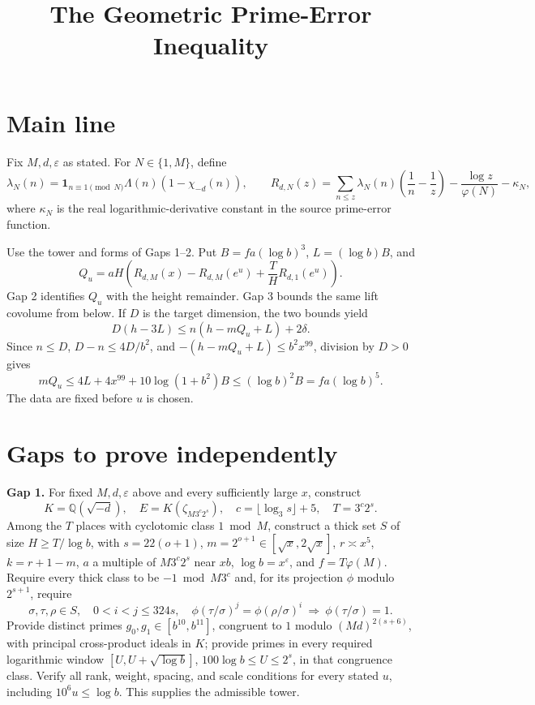 \documentclass[11pt]{article}
\begin{document}
\title{The Geometric Prime-Error Inequality}
\author{}
\date{}
\maketitle

\section*{Main line}
Fix \(M,d,\varepsilon\) as stated. For \(N\in\{1,M\}\), define
\[
\lambda_N(n)=\mathbf1_{n\equiv1\pmod N}\Lambda(n)(1-\chi_{-d}(n)),\qquad
R_{d,N}(z)=\sum_{n\le z}\lambda_N(n)\left(\frac1n-\frac1z\right)
-\frac{\log z}{\varphi(N)}-\kappa_N,
\]
where \(\kappa_N\) is the real logarithmic-derivative constant in the source prime-error function.

Use the tower and forms of Gaps 1--2. Put \(B=fa(\log b)^3\), \(L=(\log b)B\), and
\[
Q_u=aH\left(R_{d,M}(x)-R_{d,M}(e^u)+\frac TH R_{d,1}(e^u)\right).
\]
Gap 2 identifies \(Q_u\) with the height remainder. Gap 3 bounds the same lift covolume from below. If \(D\) is the target dimension, the two bounds yield
\[
D(h-3L)\le n(h-mQ_u+L)+2\delta.
\]
Since \(n\le D\), \(D-n\le4D/b^2\), and
\(-(h-mQ_u+L)\le b^2x^{99}\), division by \(D>0\) gives
\[
mQ_u\le4L+4x^{99}+10\log(1+b^2)B
\le(\log b)^2B=fa(\log b)^5.
\]
The data are fixed before \(u\) is chosen.

\section*{Gaps to prove independently}
\noindent\textbf{Gap 1.} For fixed \(M,d,\varepsilon\) above and every sufficiently large \(x\), construct
\[
K=\mathbb Q(\sqrt{-d}),\quad E=K(\zeta_{M3^c2^s}),\quad
c=\lfloor\log_3s\rfloor+5,\quad T=3^c2^s.
\]
Among the \(T\) places with cyclotomic class \(1\bmod M\), construct a thick set \(S\) of size \(H\ge T/\log b\), with \(s=22(o+1)\), \(m=2^{o+1}\in[\sqrt x,2\sqrt x]\), \(r\asymp x^5\), \(k=r+1-m\), \(a\) a multiple of \(M3^c2^s\) near \(xb\), \(\log b=x^\varepsilon\), and \(f=T\varphi(M)\). Require every thick class to be \(-1\bmod M3^c\) and, for its projection \(\phi\) modulo \(2^{s+1}\), require
\[
\sigma,\tau,\rho\in S,\quad 0<i<j\le324s,\quad
\phi(\tau/\sigma)^j=\phi(\rho/\sigma)^i
\ \Longrightarrow\ \phi(\tau/\sigma)=1.
\]
Provide distinct primes \(g_0,g_1\in[b^{10},b^{11}]\), congruent to \(1\) modulo \((Md)^{2(s+6)}\), with principal cross-product ideals in \(K\); provide primes in every required logarithmic window \([U,U+\sqrt{\log b}]\), \(100\log b\le U\le2^s\), in that congruence class. Verify all rank, weight, spacing, and scale conditions for every stated \(u\), including \(10^6u\le\log b\). This supplies the admissible tower.
\end{document}
